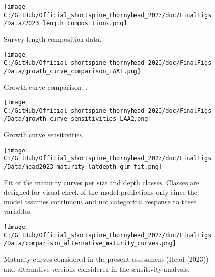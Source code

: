 \documentclass[11pt,
  english,
  letterpaper,
]{article}
\begin{document}
\begin{figure}
\centering
\texttt{[image: C:/GitHub/Official\_shortspine\_thornyhead\_2023/doc/FinalFigs/Data/2023\_length\_compositions.png]}
\caption{Survey length composition data.\label{fig:survey_comps}}
\end{figure}

\begin{figure}
\centering
\texttt{[image: C:/GitHub/Official\_shortspine\_thornyhead\_2023/doc/FinalFigs/Data/growth\_curve\_comparison\_LAA1.png]}
\caption{Growth curve comparison. .\label{fig:growth_LAA1}}
\end{figure}

\begin{figure}
\centering
\texttt{[image: C:/GitHub/Official\_shortspine\_thornyhead\_2023/doc/FinalFigs/Data/growth\_curve\_sensitivities\_LAA2.png]}
\caption{Growth curve sensitivities.\label{fig:growth_LAA2}}
\end{figure}

\begin{figure}
\centering
\texttt{[image: C:/GitHub/Official\_shortspine\_thornyhead\_2023/doc/FinalFigs/Data/head2023\_maturity\_latdepth\_glm\_fit.png]}
\caption{Fit of the maturity curves per size and depth classes. Classes are designed for visual check of the model predictions only since the model assumes continuous and not categorical response to these variables.\label{fig:mat1}}
\end{figure}

\begin{figure}
\centering
\texttt{[image: C:/GitHub/Official\_shortspine\_thornyhead\_2023/doc/FinalFigs/Data/comparison\_alternative\_maturity\_curves.png]}
\caption{Maturity curves considered in the present assessment (Head (2023)) and alternative versions considered in the sensitivity analysis.\label{fig:mat2}}
\end{figure}
\end{document}
